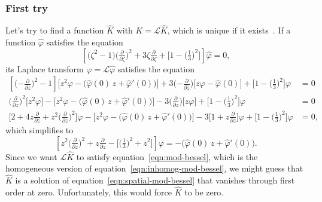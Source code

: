 \documentclass{article}
\theoremstyle{definition}
\theoremstyle{plain}
\newcommand{\laplace}{\mathcal{L}}
\begin{document}
\subsubsection{First try}
Let's try to find a function $\hat{K}$ with $K = \laplace \hat{K}$, which is unique if it exists~\cite[Theorem~1.23]{laplace-tfm}. If a function $\hat{\varphi}$ satisfies the equation
\begin{equation}\label{eqn:spatial-mod-bessel}
\left[\big(\zeta^2 - 1\big) \big(\tfrac{\partial}{\partial \zeta}\big)^2 + 3\zeta \tfrac{\partial}{\partial \zeta} + \big[1 - \big(\tfrac{1}{3}\big)^2\big]\right] \hat{\varphi} = 0,
\end{equation}
its Laplace transform $\varphi = \laplace \hat{\varphi}$ satisfies the equation
\begin{align*}
\left[\big({-\tfrac{\partial}{\partial z}}\big)^2 - 1\right] \Big[z^2 \varphi - \Big(\hat{\varphi}(0)\,z + \hat{\varphi}'(0)\Big)\Big] + 3\big({-\tfrac{\partial}{\partial z}}\big)\Big[z\varphi - \hat{\varphi}(0)\Big] + \big[1 - \big(\tfrac{1}{3}\big)^2\big] \varphi & = 0 \\
\big(\tfrac{\partial}{\partial z}\big)^2 \big[z^2 \varphi\big] - \Big[z^2 \varphi - \Big(\hat{\varphi}(0)\,z + \hat{\varphi}'(0)\Big)\Big] - 3\big(\tfrac{\partial}{\partial z}\big)\big[z\varphi\big] + \big[1 - \big(\tfrac{1}{3}\big)^2\big] \varphi & = 0 \\
\Big[2 + 4z\tfrac{\partial}{\partial z} + z^2\big(\tfrac{\partial}{\partial z}\big)^2\Big]\varphi - \Big[z^2 \varphi - \Big(\hat{\varphi}(0)\,z + \hat{\varphi}'(0)\Big)\Big] - 3\Big[1 + z\tfrac{\partial}{\partial z}\Big]\varphi + \big[1 - \big(\tfrac{1}{3}\big)^2\big] \varphi & = 0,
\end{align*}
which simplifies to
\begin{equation}\label{eqn:inhomog-mod-bessel}
\left[z^2 \big(\tfrac{\partial}{\partial z}\big)^2 + z \tfrac{\partial}{\partial z} - \big[\big(\tfrac{1}{3}\big)^2 + z^2\big]\right] \varphi = -\Big(\hat{\varphi}(0)\,z + \hat{\varphi}'(0)\Big).
\end{equation}
Since we want $\laplace \hat{K}$ to satisfy equation~\ref{eqn:mod-bessel}, which is the homogeneous version of equation~\ref{eqn:inhomog-mod-bessel}, we might guess that $\hat{K}$ is a solution of equation~\ref{eqn:spatial-mod-bessel} that vanishes through first order at zero. Unfortunately, this would force $\hat{K}$ to be zero.
\end{document}
